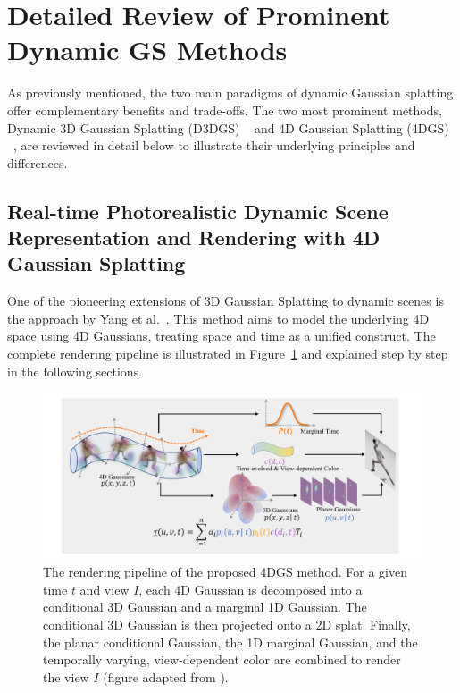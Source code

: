 \section{Detailed Review of Prominent Dynamic GS Methods}

As previously mentioned, the two main paradigms of dynamic Gaussian splatting offer complementary benefits and trade-offs. The two most prominent methods, Dynamic 3D Gaussian Splatting (D3DGS) ~\cite{luiten2024dynamic} and 4D Gaussian Splatting (4DGS) ~\cite{yang2023gs4d}, are reviewed in detail below to illustrate their underlying principles and differences.



\subsection{Real-time Photorealistic Dynamic Scene Representation and Rendering with 4D Gaussian Splatting}
\label{sec:Real-Time4dgs}

One of the pioneering extensions of 3D Gaussian Splatting to dynamic scenes is the approach by Yang et al.~\cite{yang2023gs4d}. 
This method aims to model the underlying 4D space using 4D Gaussians, treating space and time as a unified construct. 
The complete rendering pipeline is illustrated in Figure~\ref{fig:pipeline_real_time_4D} and explained step by step in the following sections.

\begin{figure}[ht]
    \centering
    \includegraphics[width=\textwidth]{Grafiken/Fundamentals/pipeline_yang.pdf}
    \caption{The rendering pipeline of the proposed 4DGS method. For a given time \(t\) and view \(I\), each 4D Gaussian is decomposed into a conditional 3D Gaussian and a marginal 1D Gaussian. The conditional 3D Gaussian is then projected onto a 2D splat. Finally, the planar conditional Gaussian, the 1D marginal Gaussian, and the temporally varying, view-dependent color are combined to render the view \(I\) (figure adapted from \cite{yang2023gs4d}).}
    \label{fig:pipeline_real_time_4D}
\end{figure}

